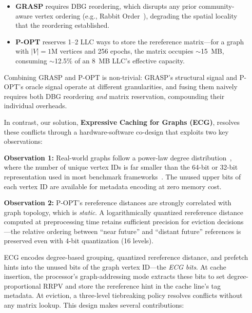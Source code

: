 \documentclass[conference]{IEEEtran}
\begin{document}
\begin{itemize}[topsep=2pt,itemsep=0pt,wide]
    \item \textbf{GRASP} requires DBG reordering, which disrupts any prior community-aware vertex ordering (e.g., Rabbit Order~\cite{arai_rabbit_2016}), degrading the spatial locality that the reordering established.
    \item \textbf{P-OPT} reserves 1--2 LLC ways to store the rereference matrix---for a graph with $|V|=1$M vertices and 256 epochs, the matrix occupies $\sim$15~MB, consuming $\sim$12.5\% of an 8~MB LLC's effective capacity.
\end{itemize}

Combining GRASP and P-OPT is non-trivial: GRASP's structural signal and P-OPT's oracle signal operate at different granularities, and fusing them naively requires both DBG reordering \emph{and} matrix reservation, compounding their individual overheads.

In contrast, our solution, \textbf{Expressive Caching for Graphs (ECG)}, resolves these conflicts through a hardware-software co-design that exploits two key observations:

\textbf{Observation 1:} Real-world graphs follow a power-law degree distribution~\cite{barabasi_scale-free_2009,zhang_making_2017,balaji_when_2018,faloutsos_power-law_1999,beamer_gap_2017,zhang_optimizing_2016}, where the number of unique vertex IDs is far smaller than the 64-bit or 32-bit representation used in most benchmark frameworks~\cite{beamer_gap_2017}. The unused upper bits of each vertex ID are available for metadata encoding at zero memory cost.

\textbf{Observation 2:} P-OPT's rereference distances are strongly correlated with graph topology, which is \emph{static}. A logarithmically quantized rereference distance computed at preprocessing time retains sufficient precision for eviction decisions---the relative ordering between ``near future'' and ``distant future'' references is preserved even with 4-bit quantization (16 levels).

ECG encodes degree-based grouping, quantized rereference distance, and prefetch hints into the unused bits of the graph vertex ID---the \emph{ECG bits}. At cache insertion, the processor's graph-addressing mode extracts these bits to set degree-proportional RRPV and store the rereference hint in the cache line's tag metadata. At eviction, a three-level tiebreaking policy resolves conflicts without any matrix lookup. This design makes several contributions:
\end{document}

